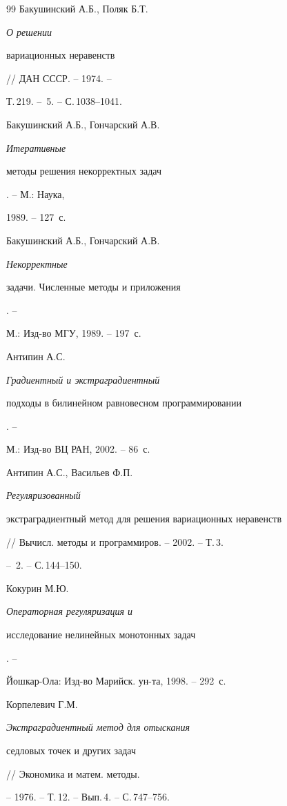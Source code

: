 \begin{thebibliography}{99}
 Бакушинский А.Б., Поляк Б.Т. {\em О решении


вариационных неравенств} // ДАН СССР. -- 1974. --


Т.\,219. -- \No\,5. -- С.\,1038--1041.





 Бакушинский А.Б., Гончарский А.В. {\em Итеративные


методы решения некорректных задач}. -- М.: Наука,


1989. -- 127~с.





 Бакушинский А.Б., Гончарский А.В. {\em Некорректные


задачи. Численные методы и приложения}. --


М.: Изд-во МГУ, 1989. -- 197~с.





 Антипин А.С. {\em Градиентный и экстраградиентный


подходы в билинейном равновесном программировании}. --


М.: Изд-во ВЦ РАН, 2002. -- 86~с.





  Антипин А.С., Васильев Ф.П. {\em Регуляризованный


экстраградиентный метод для решения вариационных неравенств}


// Вычисл. методы и программиров. -- 2002. -- Т.\,3.


-- \No\,2. -- С.\,144--150.





 Кокурин М.Ю. {\em Операторная регуляризация и


исследование нелинейных монотонных задач}. --


Йошкар-Ола: Изд-во Марийск. ун-та, 1998. -- 292~с.





 Корпелевич Г.М. {\em Экстраградиентный метод для отыскания


седловых точек и других задач} // Экономика и матем. методы.


-- 1976. -- Т.\,12. -- Вып.\,4. -- С.\,747--756.






\end{thebibliography}
